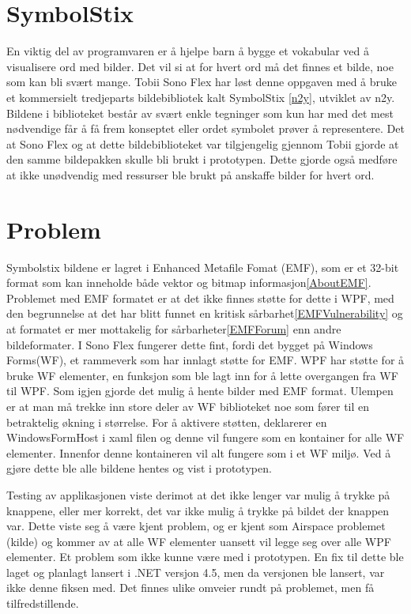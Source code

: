 \section{SymbolStix}

En viktig del av programvaren er å hjelpe barn å bygge et vokabular ved å visualisere ord med bilder. Det vil si at for hvert ord må det finnes et bilde, noe som kan bli svært mange. Tobii Sono Flex har løst denne oppgaven med å bruke et kommersielt tredjeparts bildebibliotek kalt SymbolStix \ref{n2y}, utviklet av n2y. Bildene i biblioteket består av svært enkle tegninger som kun har med det mest nødvendige får å få frem konseptet eller ordet symbolet prøver å representere. Det at Sono Flex og at dette bildebiblioteket var tilgjengelig gjennom Tobii gjorde at den samme bildepakken skulle bli brukt i prototypen. Dette gjorde også medføre at ikke unødvendig med ressurser ble brukt på anskaffe bilder for hvert ord.


\section{Problem}

Symbolstix bildene er lagret i Enhanced Metafile Fomat (EMF), som er et 32-bit format som kan inneholde både vektor og bitmap informasjon\ref{AboutEMF}. Problemet med EMF formatet er at det ikke finnes støtte for dette i WPF, med den begrunnelse at det har blitt funnet en kritisk sårbarhet\ref{EMFVulnerability} og at formatet er mer mottakelig for sårbarheter\ref{EMFForum} enn andre bildeformater. I Sono Flex fungerer dette fint, fordi det bygget på Windows Forms(WF),  et rammeverk som har innlagt støtte for EMF. WPF har støtte for å bruke WF elementer,  en funksjon som ble lagt inn for å lette overgangen fra WF til WPF. Som igjen gjorde det mulig å hente bilder med EMF format. Ulempen er at man må trekke inn store deler av WF biblioteket noe som fører til en betraktelig økning i størrelse. For å aktivere støtten, deklarerer en WindowsFormHost i xaml filen og denne vil fungere som en kontainer for alle WF elementer. Innenfor denne kontaineren vil alt fungere som i et WF miljø. Ved å gjøre dette ble alle bildene hentes og vist i prototypen. 

Testing av applikasjonen viste derimot at det ikke lenger var mulig å trykke på knappene, eller mer korrekt, det var ikke mulig å trykke på  bildet der knappen var. Dette viste seg å være kjent problem, og er kjent som Airspace problemet (kilde) og kommer av at alle WF elementer uansett vil legge seg over alle WPF elementer. Et problem som ikke kunne være med i prototypen. En fix til dette ble laget og planlagt lansert i .NET versjon 4.5, men da versjonen ble lansert, var ikke denne fiksen med. Det finnes ulike omveier rundt på problemet, men få tilfredstillende. 


